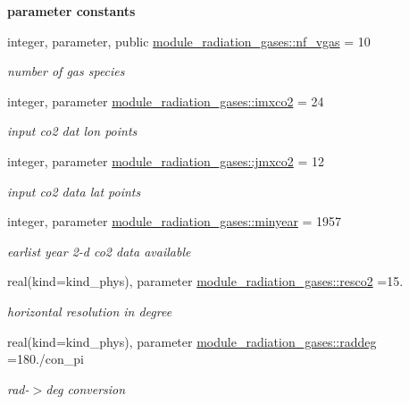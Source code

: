 \begin{Indent}\textbf{ parameter constants}\par
\begin{DoxyCompactItemize}
\item 
integer, parameter, public \hyperlink{group__module__radiation__gases_gaffc350828412da77ff3cf3e617ddc66c}{module\+\_\+radiation\+\_\+gases\+::nf\+\_\+vgas} = 10
\begin{DoxyCompactList}\small\item\em number of gas species \end{DoxyCompactList}\item 
integer, parameter \hyperlink{group__module__radiation__gases_ga46eb4079ff9932819b3ab133bf6a43d9}{module\+\_\+radiation\+\_\+gases\+::imxco2} = 24
\begin{DoxyCompactList}\small\item\em input co2 dat lon points \end{DoxyCompactList}\item 
integer, parameter \hyperlink{group__module__radiation__gases_gaa56e209872093bfcbdaeb452f5e5e332}{module\+\_\+radiation\+\_\+gases\+::jmxco2} = 12
\begin{DoxyCompactList}\small\item\em input co2 data lat points \end{DoxyCompactList}\item 
integer, parameter \hyperlink{group__module__radiation__gases_ga3b26af64187b57999cadeced419b0f1b}{module\+\_\+radiation\+\_\+gases\+::minyear} = 1957
\begin{DoxyCompactList}\small\item\em earlist year 2-\/d co2 data available \end{DoxyCompactList}\item 
real(kind=kind\+\_\+phys), parameter \hyperlink{group__module__radiation__gases_gafda5c1d1129d865b9772e0f58dea7598}{module\+\_\+radiation\+\_\+gases\+::resco2} =15.
\begin{DoxyCompactList}\small\item\em horizontal resolution in degree \end{DoxyCompactList}\item 
real(kind=kind\+\_\+phys), parameter \hyperlink{group__module__radiation__gases_gaa5873ae54e950001ff873771378e7a1e}{module\+\_\+radiation\+\_\+gases\+::raddeg} =180./con\+\_\+pi
\begin{DoxyCompactList}\small\item\em rad-\/$>$deg conversion \end{DoxyCompactList}\item 

\end{DoxyCompactItemize}
\end{Indent}
